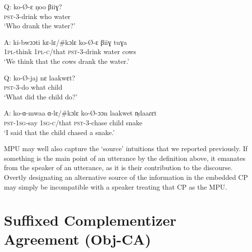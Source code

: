 \documentclass[output=paper
,newtxmath
,modfonts
,nonflat]{langsci/langscibook}
\begin{document}
\ea \label{MPU Examples} 
\begin{xlist}

\ex
\gll Q: ko-\O-ɛ ŋoo βiiɣ? \\
{} \textsc{pst}-3-drink who water \\
\glt \hspace{0.16in} `Who drank the water?'

\gll A: ki-bwɔɔti kɛ-lɛ/\#kɔlɛ ko-\O-ɛ βiiɣ tuɣa \\
{} 1\textsc{pl}-think 1\textsc{pl-c}/that \textsc{pst}-3-drink water cows \\
\glt \hspace{0.16in} `We think that the cows drank the water.'

\ex 
\gll Q: ko-\O-jaj nɛ laakwɛt? \\
{} \textsc{pst}-3-do what child \\
\glt \hspace{0.16in} `What did the child do?'

\gll A: ko-ɑ-mwaa ɑ-lɛ/\#kɔlɛ ko-\O-ɔɔn laakwet n̩daaɾɛt \\
{} \textsc{pst}-1\textsc{sg}-say 1\textsc{sg-c}/that \textsc{pst}-3-chase child snake \\
 \glt \hspace{0.16in} `I said that the child chased a snake.'

\end{xlist}
\z

\noindent MPU may well also capture the `source' intuitions that we reported previously. If something is the main point of an utterance by the definition above, it emanates from the speaker of an utterance, as it is their contribution to the discourse. Overtly designating an alternative source of the information in the embedded CP may simply be incompatible with a speaker treating that CP as the MPU. 



\section{Suffixed Complementizer Agreement (Obj-CA)} \label{ObjCASect}

\end{document}
